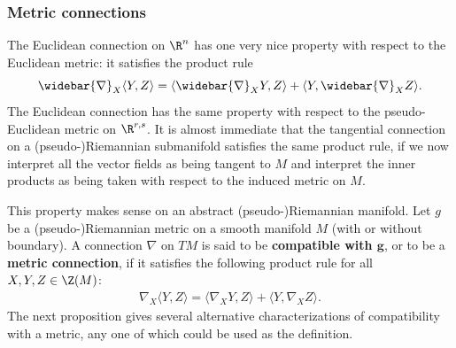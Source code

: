 \subsubsection{Metric connections}
The Euclidean connection on $\R^n$ has one very nice property with respect to the Euclidean metric: it satisfies the product rule
\[\widebar{\nabla}_X\langle Y,Z\rangle=\langle \widebar{\nabla}_XY,Z\rangle+\langle Y,\widebar{\nabla}_XZ\rangle.\]
The Euclidean connection has the same property with respect to the pseudo-Euclidean metric on $\R^{r,s}$. It is almost immediate that the tangential connection on a (pseudo-)Riemannian submanifold satisfies the same product rule, if we now interpret all the vector fields as being tangent to $M$ and interpret the inner products as being taken with respect to the induced metric on $M$.\par
This property makes sense on an abstract (pseudo-)Riemannian manifold. Let $g$ be a (pseudo-)Riemannian metric on a smooth manifold $M$ (with or without boundary). A connection $\nabla$ on $TM$ is said to be \textbf{compatible with $\bm{g}$}, or to be a \textbf{metric connection}, if it satisfies the following 
product rule for all $X,Y,Z\in\Z(M)$:
\begin{align}\label{metirc connection def}
\nabla_X\langle Y,Z\rangle=\langle\nabla_XY,Z\rangle+\langle Y,\nabla_XZ\rangle.
\end{align}
The next proposition gives several alternative characterizations of compatibility with a metric, any one of which could be used as the definition.
